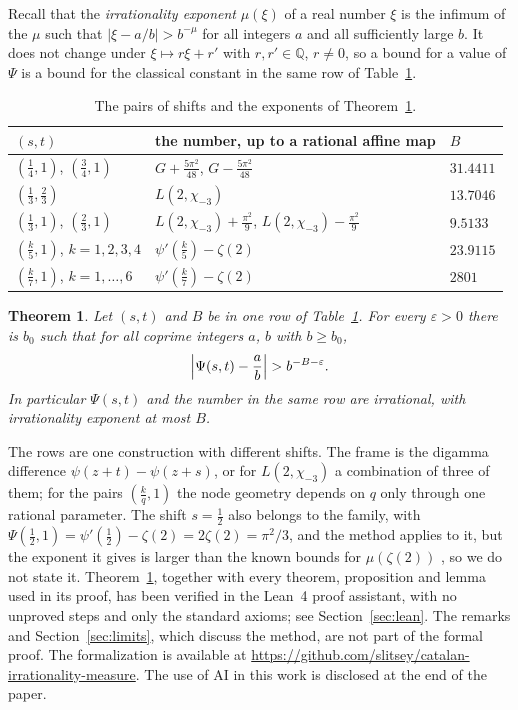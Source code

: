 \documentclass[11pt]{amsart}
\newcommand{\FormalizationURL}{https://github.com/slitsey/catalan-irrationality-measure}
\newcommand{\FormalizationLink}{\url{\FormalizationURL}}
\newtheorem{theorem}{Theorem}[section]
\theoremstyle{definition}
\theoremstyle{remark}
\numberwithin{equation}{section}
\newcommand{\Q}{\mathbb Q}
\newcommand{\MuLamU}{31.4411}
\newcommand{\MuThirdsU}{9.5133}
\newcommand{\MuFifthsU}{23.9115}
\newcommand{\MuSeventhsU}{2801}
\newcommand{\MuChi}{13.7046}
\begin{document}
Recall that the \emph{irrationality exponent} $\mu(\xi)$ of a real number $\xi$ is the
infimum of the $\mu$ such that $|\xi-a/b|>b^{-\mu}$ for all integers $a$ and all
sufficiently large $b$. It does not change under $\xi\mapsto r\xi+r'$ with $r,r'\in\Q$, $r\ne0$, so a
bound for a value of $\Psi$ is a bound for the classical constant in the same row of
Table~\ref{tab:main}.

\begin{table}[ht]
\centering
\begin{tabular}{@{}lll@{}}
\toprule
$(s,t)$ & the number, up to a rational affine map & $B$ \\
\midrule
$(\frac14,1)$, $(\frac34,1)$ & $G+\frac{5\pi^2}{48}$, $G-\frac{5\pi^2}{48}$ & $\MuLamU$ \\
$(\frac13,\frac23)$ & $L(2,\chi_{-3})$ & $\MuChi$ \\
$(\frac13,1)$, $(\frac23,1)$ & $L(2,\chi_{-3})+\frac{\pi^2}9$, $L(2,\chi_{-3})-\frac{\pi^2}9$ & $\MuThirdsU$ \\
$(\frac k5,1)$, $k=1,2,3,4$ & $\psi'(\frac k5)-\zeta(2)$ & $\MuFifthsU$ \\
$(\frac k7,1)$, $k=1,\dots,6$ & $\psi'(\frac k7)-\zeta(2)$ & $\MuSeventhsU$ \\
\bottomrule
\end{tabular}
\caption{The pairs of shifts and the exponents of Theorem~\ref{thm:main}.}\label{tab:main}
\end{table}

\begin{theorem}\label{thm:main}\label{thm:thirds}\label{thm:fifths}
Let $(s,t)$ and $B$ be in one row of Table~\ref{tab:main}. For every $\varepsilon>0$ there is $b_0$ such
that for all coprime integers $a$, $b$ with $b\ge b_0$,
\[
 \Bigl|\Psi(s,t)-\frac ab\Bigr|>b^{-B-\varepsilon}.
\]
In particular $\Psi(s,t)$ and the number in the same row are irrational, with irrationality exponent at
most $B$.
\end{theorem}

The rows are one construction with different shifts. The frame is the digamma difference
$\psi(z+t)-\psi(z+s)$, or for $L(2,\chi_{-3})$ a combination of three of them; for the pairs
$(\frac kq,1)$ the node geometry depends on $q$ only through one rational parameter. The shift
$s=\frac12$ also belongs to the family, with $\Psi(\frac12,1)=\psi'(\frac12)-\zeta(2)=2\zeta(2)=\pi^2/3$, and the
method applies to it, but the exponent it gives is larger than the known bounds for $\mu(\zeta(2))$
\cite{Giraudin26,LBKWSK26}, so we do not state it. Theorem~\ref{thm:main}, together with every theorem, proposition and
lemma used in its proof, has been verified in the Lean~4 proof assistant, with no unproved steps and only the standard
axioms; see Section~\ref{sec:lean}. The remarks and Section~\ref{sec:limits}, which discuss the method, are not part of the
formal proof. The formalization is available at \FormalizationLink. The use of AI
in this work is disclosed at the end of the paper.
\end{document}
